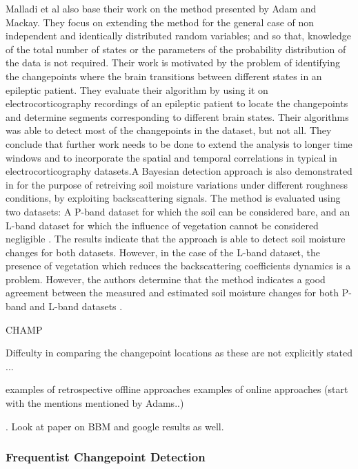 \documentclass[13pt]{report}
\begin{document}
Malladi et al also base their work on the method presented by Adam and Mackay. They focus on extending the method for the general case of non independent and identically distributed random variables; and so that, knowledge of the total number of states or the parameters of the probability distribution of the data is not required\cite{malladi2013online}. Their work is motivated by the problem of identifying  the changepoints where the brain transitions between different states in an epileptic patient. They evaluate their algorithm by using it on electrocorticography recordings of an epileptic patient to locate the changepoints and determine segments corresponding to different brain states\cite{malladi2013online}. Their algorithms was able to detect most of the changepoints in the dataset, but not all. They conclude that further work needs to be done to extend the analysis to longer time windows and to incorporate the spatial and temporal correlations in typical in electrocorticography datasets\cite{malladi2013online}.A Bayesian detection approach is also demonstrated  in \cite{notarnicola2014bayesian} for the purpose of retreiving soil moisture variations under different roughness conditions, by exploiting backscattering signals. The method is evaluated using two datasets: A P-band dataset for which the soil can be considered bare, and an L-band dataset for which the influence of vegetation cannot be considered negligible \cite{notarnicola2014bayesian}. The results indicate that the approach is able to detect soil moisture changes for both datasets. However, in the case of the L-band dataset, the presence of vegetation which reduces the backscattering coefficients dynamics is a problem\cite{notarnicola2014bayesian}.  However, the authors determine that the method indicates a good agreement between the measured and estimated soil moisture changes for both P-band and L-band datasets \cite{notarnicola2014bayesian}.

CHAMP  


Diffculty in comparing the changepoint locations as these are not explicitly stated ...
 
examples of retrospective offline approaches
examples of online approaches (start with the mentions mentioned by Adams..)

.  
Look at paper on BBM and google results as well.

\subsubsection{Frequentist Changepoint Detection}
\end{document}
